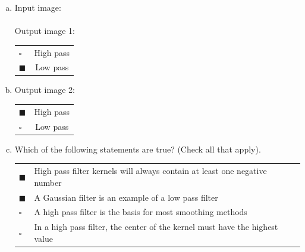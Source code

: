 \begin{enumerate}[(a)]
\item
Input image:\\
 \\
Output image 1:\\
\begin{tabular}[h]{lc}
$\square$ & High pass \\
$\blacksquare$ & Low pass \\
\end{tabular}

\item
Output image 2:\\
\begin{tabular}[h]{lc}
$\blacksquare$ & High pass \\
$\square$ & Low pass \\
\end{tabular}

\item
Which of the following statements are true? (Check all that apply).

\begin{tabular}[h]{ll}
$\blacksquare$ & High pass filter kernels will always contain at least one negative number \\
$\blacksquare$ & A Gaussian filter is an example of a low pass filter \\
$\square$ & A high pass filter is the basis for most smoothing methods \\
$\square$ & In a high pass filter, the center of the kernel must have the highest value \\
\end{tabular}

\end{enumerate}




